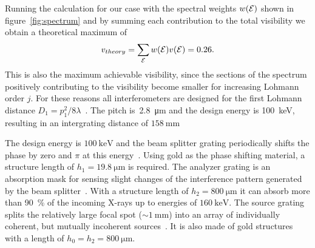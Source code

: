 Running the calculation for our case with the spectral weights $w(\mathcal{E})$ shown in
figure~\ref{fig:spectrum} and by summing each contribution to the total
visibility we obtain a theoretical maximum of
\begin{equation}
    v_{theory} = \sum_{\mathcal{E}} w(\mathcal{E})v(\mathcal{E}) = 0.26.
    \label{eq:maximum.visibility}
\end{equation}
This is also the maximum achievable visibility, since the sections of the
spectrum positively contributing to the visibility become smaller for
increasing Lohmann order $j$.
For these reasons all interferometers are designed for the first Lohmann
distance $D_1 = p_1^2 / 8 \lambda$~\parencite{Weitkamp2005}. The pitch
is~\SI{2.8}{\micro\meter} and the design energy is \SI{100}{\kilo\eV}, resulting in an
intergrating distance of $\SI{158}{\milli\metre}$

The design energy is $\SI{100}{\kilo\electronvolt}$ and the beam splitter
grating periodically shifts the phase by zero and $\pi$ at this
energy~\parencite{David2002}. Using
gold as the phase shifting material, a structure length of
$h_1 = \SI{19.8}{\micro \metre}$ is required. The analyzer grating is an absorption mask
for sensing slight changes of the interference pattern generated by the beam
splitter~\parencite{Momose2003a}. With a structure length of $h_2 =
\SI{800}{\micro \metre}$
it can absorb more than \SI{90}{\percent} of the incoming X-rays up to energies of 
$\SI{160}{\kilo\electronvolt}$.
The source grating splits the relatively large focal spot ($\sim
\SI{1}{\milli\metre}$) into an array of individually coherent, but mutually
incoherent sources~\parencite{Pfeiffer2006}. It is also made of gold structures
with a length of $h_0 = h_2 = \SI{800}{\micro \metre}$.

